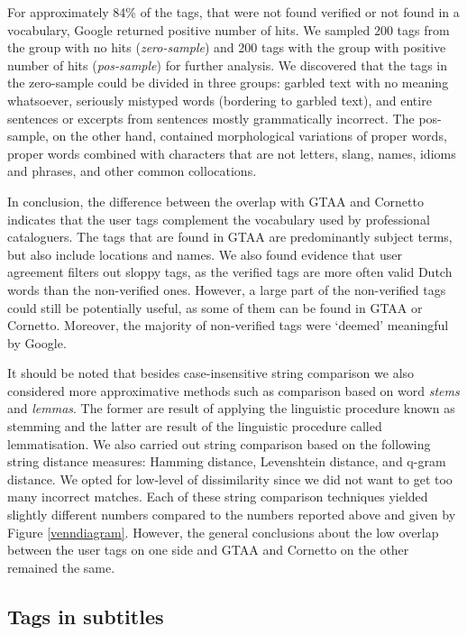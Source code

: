 For approximately 84\% of the tags, that were not found verified or not found
in a vocabulary, Google returned positive number of hits. We sampled 200 tags
from the group with no hits (\textit{zero-sample}) and 200 tags with the group
with positive number of hits (\textit{pos-sample}) for further analysis. We
discovered that the tags in the zero-sample could be divided in three groups:
garbled text with no meaning whatsoever, seriously mistyped words (bordering
to garbled text), and entire sentences or excerpts from sentences mostly
grammatically incorrect. The pos-sample, on the other hand, contained
morphological variations of proper words, proper words combined with
characters that are not letters, slang, names, idioms and phrases, and other
common collocations.

In conclusion, the difference between the overlap with GTAA and Cornetto
indicates that the user tags complement the vocabulary used by professional
cataloguers. The tags that are found in GTAA are predominantly subject terms,
but also include locations and names. We also found evidence that user
agreement filters out sloppy tags, as the verified tags are more often valid
Dutch words than the non-verified ones. However, a large part of the
non-verified tags could still be potentially useful, as some of them can be
found in GTAA or Cornetto. Moreover, the majority of non-verified tags were
`deemed' meaningful by Google.

It should be noted that besides case-insensitive string comparison we also considered more approximative methods such as comparison based on word \textit{stems} and \textit{lemmas}. The former are result of applying the linguistic procedure known as stemming and the latter are result of the linguistic procedure called lemmatisation. We also carried out string comparison based on  the following string distance measures: Hamming distance, Levenshtein distance, and q-gram distance. We opted for low-level of dissimilarity since we did not want to get too many incorrect matches. Each of these string comparison techniques yielded slightly different numbers compared to the numbers reported above and given by Figure \ref{venndiagram}. However, the general conclusions about the low overlap between the user tags on one side and GTAA and Cornetto on the other remained the same. 


\subsection{Tags in subtitles}
\label{tags-in-transcripts}

